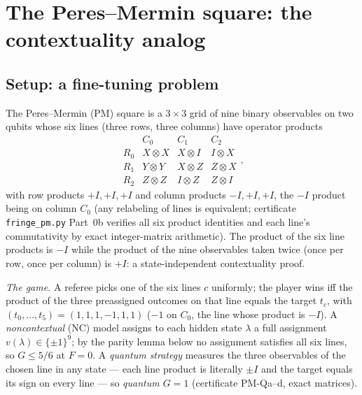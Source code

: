 \documentclass[aps,pra,reprint,superscriptaddress,floatfix]{revtex4-2}
\begin{document}
\section{The Peres--Mermin square: the contextuality analog}
\label{sec:pm}

\subsection{Setup: a fine-tuning problem}

The Peres--Mermin (PM) square \cite{peres1990,mermin1990b} is a $3\times 3$ grid of
nine binary observables on two qubits whose six lines (three rows, three
columns) have operator products
\begin{equation*}
\begin{array}{c|ccc}
 & C_{0} & C_{1} & C_{2}\\
\hline
R_{0} & X\!\otimes\!X & X\!\otimes\!I & I\!\otimes\!X\\
R_{1} & Y\!\otimes\!Y & X\!\otimes\!Z & Z\!\otimes\!X\\
R_{2} & Z\!\otimes\!Z & I\!\otimes\!Z & Z\!\otimes\!I
\end{array},
\end{equation*}
with row products $+I,+I,+I$ and column products $-I,+I,+I$, the $-I$
product being on column $C_{0}$ (any relabeling of lines is equivalent;
certificate \texttt{fringe\_pm.py} Part~0b verifies all six product
identities and each line's commutativity by exact integer-matrix
arithmetic). The product of the six line products is $-I$ while the
product of the nine observables taken twice (once per row, once per
column) is $+I$: a state-independent contextuality proof.

\emph{The game.} A referee picks one of the six lines $c$ uniformly; the
player wins iff the product of the three preassigned outcomes on that
line equals the target $t_{c}$, with $(t_{0},\dots,t_{5})=(1,1,1,-1,1,1)$
($-1$ on $C_{0}$, the line whose product is $-I$). A
\emph{noncontextual} (NC) model assigns to each hidden state $\lambda$ a
full assignment $v(\lambda)\in\{\pm1\}^{9}$; by the parity lemma below no
assignment satisfies all six lines, so $G\le 5/6$ at $F=0$. A
\emph{quantum strategy} measures the three observables of the chosen line
in any state --- each line product is literally $\pm I$ and the target
equals its sign on every line --- so \emph{quantum $G=1$} (certificate
PM-Qa--d, exact matrices).
\end{document}
